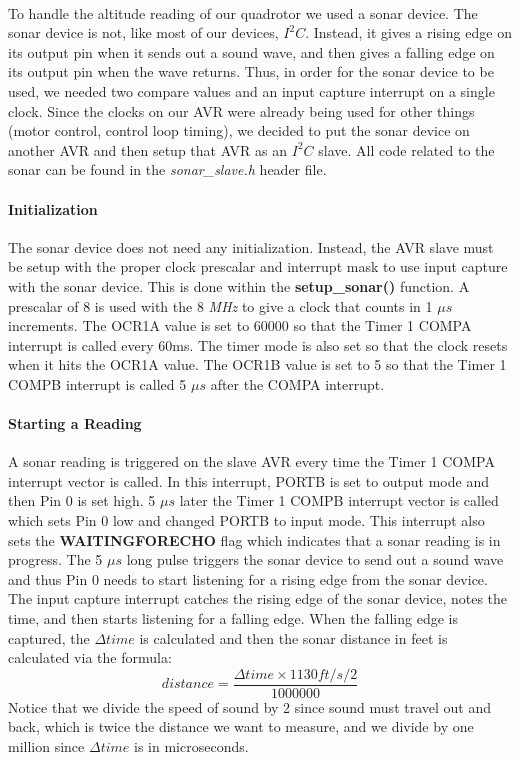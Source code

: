 \paragraph{}
To handle the altitude reading of our quadrotor we used a sonar device.  The sonar device is not, like most of our devices, $I^{2}C$.  Instead, it gives a rising edge on its output pin when it sends out a sound wave, and then gives a falling edge on its output pin when the wave returns.  Thus, in order for the sonar device to be used, we needed two compare values and an input capture interrupt on a single clock.  Since the clocks on our AVR were already being used for other things (motor control, control loop timing), we decided to put the sonar device on another AVR and then setup that AVR as an $I^{2}C$ slave.  All code related to the sonar can be found in the {\it sonar\_slave.h} header file.

\paragraph{Initialization}
The sonar device does not need any initialization.  Instead, the AVR slave must be setup with the proper clock prescalar and interrupt mask to use input capture with the sonar device.  This is done within the {\bf setup\_sonar()} function.  A prescalar of 8 is used with the 8 {\it MHz} to give a clock that counts in 1 $\mu s$ increments.  The OCR1A value is set to 60000 so that the Timer 1 COMPA interrupt is called every 60ms.  The timer mode is also set so that the clock resets when it hits the OCR1A value.  The OCR1B value is set to 5 so that the Timer 1 COMPB interrupt is called 5 $\mu s$ after the COMPA interrupt.

\paragraph{Starting a Reading}
A sonar reading is triggered on the slave AVR every time the Timer 1 COMPA interrupt vector is called.  In this interrupt, PORTB is set to output mode and then Pin 0 is set high.  5 $\mu s$ later the Timer 1 COMPB interrupt vector is called which sets Pin 0 low and changed PORTB to input mode.  This interrupt also sets the {\bf WAITINGFORECHO} flag which indicates that a sonar reading is in progress.  The 5 $\mu s$ long pulse triggers the sonar device to send out a sound wave and thus Pin 0 needs to start listening for a rising edge from the sonar device.  The input capture interrupt catches the rising edge of the sonar device, notes the time, and then starts listening for a falling edge.  When the falling edge is captured, the $\Delta time$ is calculated and then the sonar distance in feet is calculated via the formula:
\begin{equation}
distance = \frac{\Delta time \times 1130 ft/s / 2}{1000000}
\end{equation}
Notice that we divide the speed of sound by 2 since sound must travel out and back, which is twice the distance we want to measure, and we divide by one million since $\Delta time$ is in microseconds.

